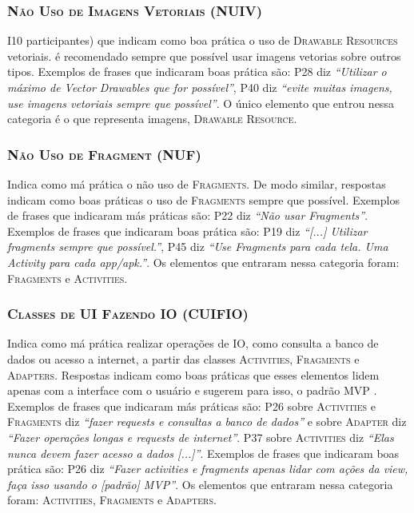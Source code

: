 \subsubsection{\textsc{Não Uso de Imagens Vetoriais (NUIV)}}
I10 participantes) que indicam como boa prática o uso de \textsc{Drawable Resources} vetoriais. é recomendado sempre que possível usar imagens vetorias sobre outros tipos. Exemplos de frases que indicaram boas prática são: P28 diz \textit{``Utilizar o máximo de Vector Drawables que for possível''}, P40 diz \textit{``evite muitas imagens, use imagens vetoriais sempre que possível''}. O único elemento que entrou nessa categoria é o que representa imagens, \textsc{Drawable Resource}.

\subsubsection{\textsc{Não Uso de Fragment (NUF)}}
Indica como má prática o não uso de \textsc{Fragments}. De modo similar, respostas indicam como boas práticas o uso de \textsc{Fragments} sempre que possível. Exemplos de frases que indicaram más práticas são: P22 diz \textit{``Não usar Fragments''}. Exemplos de frases que indicaram boas prática são: P19 diz \textit{``[...] Utilizar fragments sempre que possível.''}, P45 diz \textit{``Use Fragments para cada tela. Uma Activity para cada app/apk.''}. Os elementos que entraram nessa categoria foram: \textsc{Fragments} e \textsc{Activities}. 


\subsubsection{\textsc{Classes de UI Fazendo IO (CUIFIO)}}
Indica como má prática realizar operações de IO, como consulta a banco de dados ou acesso a internet, a partir das classes \textsc{Activities}, \textsc{Fragments} e \textsc{Adapters}. Respostas indicam como boas práticas que esses elementos lidem apenas com a interface com o usuário e sugerem para isso, o padrão MVP \cite{WikipediaMVP, MartinFowlerGUIArchitectures}. Exemplos de frases que indicaram más práticas são: P26 sobre \textsc{Activities} e \textsc{Fragments} diz \textit{``fazer requests e consultas a banco de dados''} e sobre \textsc{Adapter} diz \textit{``Fazer operações longas e requests de internet''}. P37 sobre \textsc{Activities} diz \textit{``Elas nunca devem fazer acesso a dados [...]''}. Exemplos de frases que indicaram boas prática são: P26 diz \textit{``Fazer activities e fragments apenas lidar com ações da view, faça isso usando o [padrão] MVP''}. Os elementos que entraram nessa categoria foram: \textsc{Activities}, \textsc{Fragments} e \textsc{Adapters}. 

